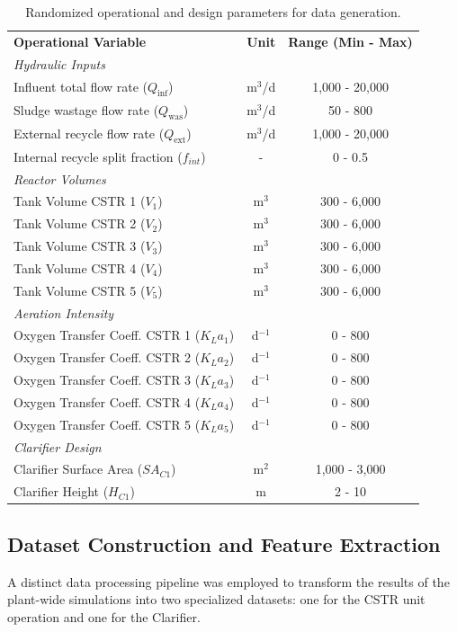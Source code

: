 \documentclass{article}
\begin{document}
\begin{table}[h]
\centering
\caption{Randomized operational and design parameters for data generation.}
\label{tab:operational-bounds}
\begin{tabular}{l c c}
\textbf{Operational Variable} & \textbf{Unit} & \textbf{Range (Min - Max)} \\
\textit{Hydraulic Inputs} & & \\
Influent total flow rate ($Q_{\text{inf}}$) & m$^{3}$/d & 1,000 - 20,000 \\
Sludge wastage flow rate ($Q_{\text{was}}$) & m$^{3}$/d & 50 - 800 \\
External recycle flow rate ($Q_{\text{ext}}$) & m$^{3}$/d & 1,000 - 20,000 \\
Internal recycle split fraction ($f_{int}$) & - & 0 - 0.5 \\
\textit{Reactor Volumes} & & \\
Tank Volume CSTR 1 ($V_{1}$) & m$^{3}$ & 300 - 6,000 \\
Tank Volume CSTR 2 ($V_{2}$) & m$^{3}$ & 300 - 6,000 \\
Tank Volume CSTR 3 ($V_{3}$) & m$^{3}$ & 300 - 6,000 \\
Tank Volume CSTR 4 ($V_{4}$) & m$^{3}$ & 300 - 6,000 \\
Tank Volume CSTR 5 ($V_{5}$) & m$^{3}$ & 300 - 6,000 \\
\textit{Aeration Intensity} & & \\
Oxygen Transfer Coeff. CSTR 1 ($K_{L}a_{1}$) & d$^{-1}$ & 0 - 800 \\
Oxygen Transfer Coeff. CSTR 2 ($K_{L}a_{2}$) & d$^{-1}$ & 0 - 800 \\
Oxygen Transfer Coeff. CSTR 3 ($K_{L}a_{3}$) & d$^{-1}$ & 0 - 800 \\
Oxygen Transfer Coeff. CSTR 4 ($K_{L}a_{4}$) & d$^{-1}$ & 0 - 800 \\
Oxygen Transfer Coeff. CSTR 5 ($K_{L}a_{5}$) & d$^{-1}$ & 0 - 800 \\
\textit{Clarifier Design} & & \\
Clarifier Surface Area ($SA_{C1}$) & m$^{2}$ & 1,000 - 3,000 \\
Clarifier Height ($H_{C1}$) & m & 2 - 10 \\
\end{tabular}
\end{table}

\subsection{Dataset Construction and Feature Extraction}
A distinct data processing pipeline was employed to transform the results of the plant-wide simulations into two specialized datasets: one for the CSTR unit operation and one for the Clarifier.
\end{document}
